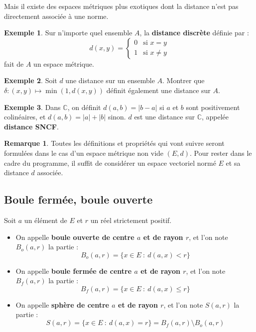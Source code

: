 \documentclass[french]{article}
\newcommand{\C}{\mathbb{C}}
\theoremstyle{plain}
\theoremstyle{definition}
\newtheorem*{ex}{Exemple}
\newtheorem*{rmq}{Remarque}
\theoremstyle{remark}
\begin{document}
Mais il existe des espaces métriques plus exotiques dont la distance n'est pas directement associée à une norme.

\begin{ex}
	Sur n'importe quel ensemble $A$, la \textbf{distance discrète} définie par : $$d(x,y)=\begin{cases}
		0&\text{si }x=y\\
		1&\text{si }x\ne y 
	\end{cases}$$ fait de $A$ un espace métrique.
\end{ex}

\begin{ex}
	Soit $d$ une distance sur un ensemble $A$. Montrer que $\delta:(x,y)\mapsto\min(1,d(x,y))$ définit également une distance sur $A$.
\end{ex}

\begin{ex}
	Dans $\C$, on définit $d(a,b)=\lvert b-a\rvert$ si $a$ et $b$ sont positivement colinéaires, et $d(a,b)=\lvert a\rvert+\lvert b\rvert$ sinon. $d$ est une distance sur $\C$, appelée \textbf{distance SNCF}.
\end{ex}

\begin{rmq}%
	Toutes les définitions et propriétés qui vont suivre seront formulées dans le cas d'un espace métrique non vide $(E,d)$. Pour rester dans le cadre du programme, il suffit de considérer un espace vectoriel normé $E$ et sa distance $d$ associée.
\end{rmq}

\subsection{Boule fermée, boule ouverte}

\begin{dfn}
	Soit $a$ un élément de $E$ et $r$ un réel strictement positif.
	\begin{itemize}
		\item On appelle \textbf{boule ouverte de centre $a$ et de rayon $r$}, et l'on note $B_o(a,r)$ la partie : $$B_o(a,r)=\{x\in E\ : \ d(a,x)<r\}$$
		\item On appelle \textbf{boule fermée de centre $a$ et de rayon $r$}, et l'on note $B_f(a,r)$ la partie : $$B_f(a,r)=\{x\in E\ : \ d(a,x)\leqslant r\}$$
		\item On appelle \textbf{sphère de centre $a$ et de rayon $r$}, et l'on note $S(a,r)$ la partie : $$S(a,r)=\{x\in E\ : \ d(a,x)=r\}=B_f(a,r)\setminus B_o(a,r)$$
	\end{itemize}
\end{dfn}
\end{document}
